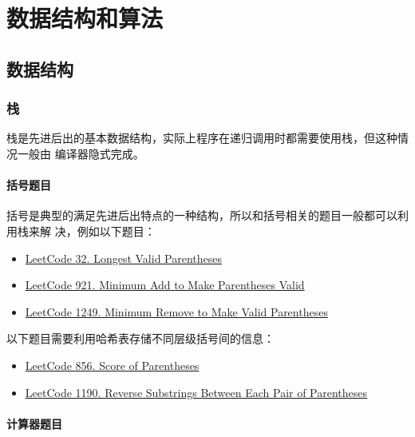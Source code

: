 \part{数据结构和算法}

\chapter{数据结构}

\section{栈}
栈是先进后出的基本数据结构，实际上程序在递归调用时都需要使用栈，但这种情况一般由
编译器隐式完成。

\subsection{括号题目}
括号是典型的满足先进后出特点的一种结构，所以和括号相关的题目一般都可以利用栈来解
决，例如以下题目：


\begin{itemize}
  \item
    \href{https://leetcode.com/problems/longest-valid-parentheses/}{LeetCode 32. Longest Valid Parentheses}
  \item
    \href{https://leetcode.com/problems/minimum-add-to-make-parentheses-valid/}{LeetCode
      921. Minimum Add to Make Parentheses Valid}
  \item
    \href{https://leetcode.com/problems/minimum-remove-to-make-valid-parentheses/}{LeetCode
      1249. Minimum Remove to Make Valid Parentheses}
\end{itemize}

以下题目需要利用哈希表存储不同层级括号间的信息：

\begin{itemize}
\item
  \href{https://leetcode.com/problems/score-of-parentheses/}{LeetCode 856. Score of Parentheses}
\item
  \href{https://leetcode.com/problems/reverse-substrings-between-each-pair-of-parentheses/}{LeetCode
    1190. Reverse Substrings Between Each Pair of Parentheses}
\end{itemize}

\subsection{计算器题目}

